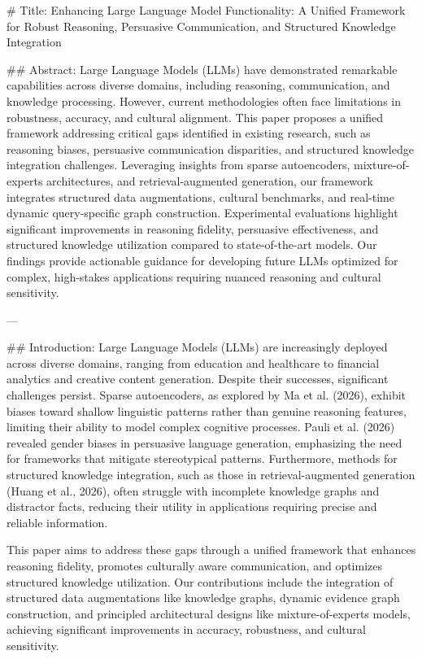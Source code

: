 # Title: Enhancing Large Language Model Functionality: A Unified Framework for Robust Reasoning, Persuasive Communication, and Structured Knowledge Integration

## Abstract:
Large Language Models (LLMs) have demonstrated remarkable capabilities across diverse domains, including reasoning, communication, and knowledge processing. However, current methodologies often face limitations in robustness, accuracy, and cultural alignment. This paper proposes a unified framework addressing critical gaps identified in existing research, such as reasoning biases, persuasive communication disparities, and structured knowledge integration challenges. Leveraging insights from sparse autoencoders, mixture-of-experts architectures, and retrieval-augmented generation, our framework integrates structured data augmentations, cultural benchmarks, and real-time dynamic query-specific graph construction. Experimental evaluations highlight significant improvements in reasoning fidelity, persuasive effectiveness, and structured knowledge utilization compared to state-of-the-art models. Our findings provide actionable guidance for developing future LLMs optimized for complex, high-stakes applications requiring nuanced reasoning and cultural sensitivity.

---

## Introduction:
Large Language Models (LLMs) are increasingly deployed across diverse domains, ranging from education and healthcare to financial analytics and creative content generation. Despite their successes, significant challenges persist. Sparse autoencoders, as explored by Ma et al. (2026), exhibit biases toward shallow linguistic patterns rather than genuine reasoning features, limiting their ability to model complex cognitive processes. Pauli et al. (2026) revealed gender biases in persuasive language generation, emphasizing the need for frameworks that mitigate stereotypical patterns. Furthermore, methods for structured knowledge integration, such as those in retrieval-augmented generation (Huang et al., 2026), often struggle with incomplete knowledge graphs and distractor facts, reducing their utility in applications requiring precise and reliable information.

This paper aims to address these gaps through a unified framework that enhances reasoning fidelity, promotes culturally aware communication, and optimizes structured knowledge utilization. Our contributions include the integration of structured data augmentations like knowledge graphs, dynamic evidence graph construction, and principled architectural designs like mixture-of-experts models, achieving significant improvements in accuracy, robustness, and cultural sensitivity.

